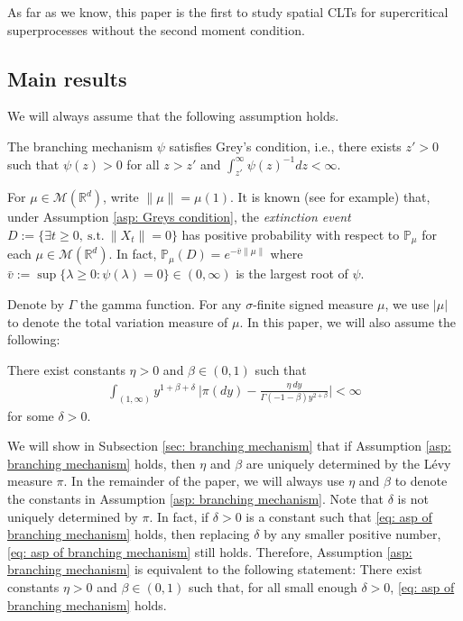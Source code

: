 \documentclass[EJP]{ejpecp} %
\begin{document}
As far as we know, this paper is the first to study spatial CLTs for supercritical superprocesses without the second moment condition.

\subsection{Main results}
\label{sec:I:R}
We will always assume that the following assumption holds.
\begin{assumption}
  \label{asp: Greys condition}
  The branching mechanism $\psi$ satisfies Grey's condition, i.e., there exists $z' > 0$ such that $\psi(z) > 0$ for all $z>z'$ and  $\int_{z'}^\infty \psi(z)^{-1}dz < \infty$.
\end{assumption}
For $\mu \in \mathcal M(\mathbb R^d)$, write $\|\mu\| = \mu(1)$.
It is known (see \cite[Theorems 12.5 \& 12.7]{Kyprianou2014Fluctuations} for example) that, under Assumption \ref{asp: Greys condition}, the \emph{extinction event} $D :=\{\exists t\geq 0,~\text{s.t.}~ \|X_t\| =0 \}$ has positive probability with respect to $\mathbb P_\mu$ for each  $\mu \in \mathcal M(\mathbb R^d)$.
In fact, $ \mathbb{P}_{\mu} (D) = e^{-\bar v \|\mu\|}$ where $ \bar v := \sup\{\lambda \geq 0: \psi(\lambda) = 0\} \in (0,\infty) $ is the largest root of $\psi$.

Denote by $\Gamma$ the gamma function.
For any $\sigma$-finite signed measure $\mu$, we use $|\mu|$ to denote the total variation measure of $\mu$.
In this paper, we will also assume the following:
\begin{assumption}
  \label{asp: branching mechanism}
  There exist constants $\eta > 0$ and $\beta \in (0,1)$ such that
  \begin{align}
    \label{eq: asp of branching mechanism}
    \int_{(1,\infty)}y^{1+\beta +\delta}~\Big|\pi(dy)-\frac{\eta~dy}{\Gamma(-1-\beta)y^{2+\beta}}\Big| <\infty
  \end{align}
	for some $\delta > 0$.
\end{assumption}
We will show in Subsection \ref{sec: branching mechanism} that if Assumption \ref{asp: branching mechanism} holds, then $\eta$ and $\beta$ are uniquely determined by the L\'evy measure $\pi$.
In the remainder of the paper, we will always use $\eta$ and $\beta$ to denote the constants in Assumption  \ref{asp: branching mechanism}.
	Note that $\delta$ is not uniquely determined by $\pi$.
	In fact, if $\delta>0$ is a constant such that \eqref{eq: asp of branching mechanism} holds, then replacing $\delta$ by any smaller positive number, \eqref{eq: asp of branching mechanism} still holds.
	Therefore, Assumption \ref{asp: branching mechanism} is equivalent to the following statement:
	There exist constants $\eta > 0$ and $\beta \in (0,1)$ such that, for all small enough $\delta>0$, \eqref{eq: asp of branching mechanism} holds.
\end{document}
